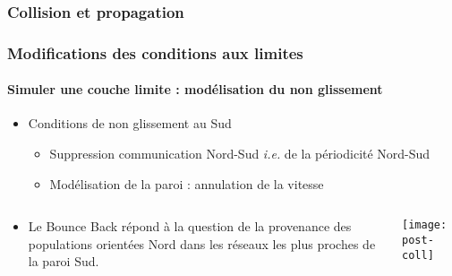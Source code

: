 \documentclass[12pt, xcolor=svgnames]{beamer}
\newcommand{\bwarrow}{\item[\color{DarkRed} \ding{227}]}
\newcommand{\warrow}{\item[\color{blue!50!black!70} \tiny{\ding{109}}]}
\begin{document}
\begin{frame}
\frametitle{Collision et propagation}




\end{frame}

\begin{frame}
\frametitle{Modifications des conditions aux limites}
\framesubtitle{Simuler une couche limite : modélisation du non glissement }

\begin{itemize}
	\bwarrow Conditions de non glissement au Sud
		\begin{itemize}
			\warrow Suppression communication Nord-Sud \textit{i.e.} de la périodicité Nord-Sud
			\warrow Modélisation de la paroi : annulation de la vitesse\\
	\end{itemize}
\end{itemize}
\begin{columns}
\begin{column}{0.6\textwidth}
	\begin{itemize}
		\bwarrow Le Bounce Back répond à la question de la provenance des populations orientées Nord dans les réseaux les plus proches de la paroi Sud.  
	\end{itemize}
\end{column}

\begin{column}{0.3\textwidth}
	\begin{center}
	\texttt{[image: post-coll]}
	\end{center}
\end{column}
\end{columns}

\end{frame}
\end{document}

